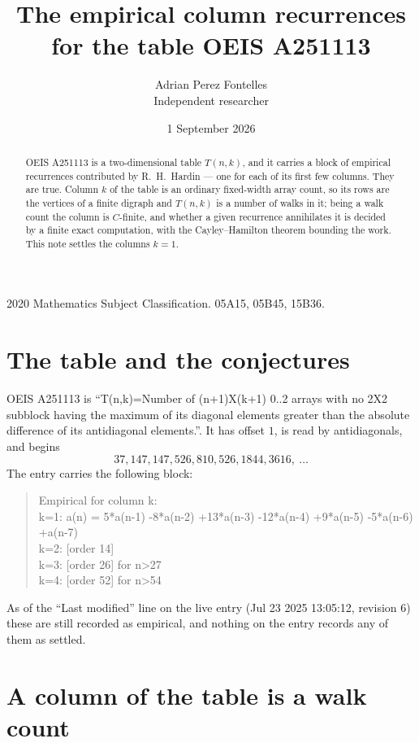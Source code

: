 \documentclass[11pt,a4paper]{article}
\title{The empirical column recurrences for the table OEIS A251113}
\author{Adrian Perez Fontelles\\ \small Independent researcher}
\date{1 September 2026}
\theoremstyle{plain}
\theoremstyle{definition}
\begin{document}
\maketitle

\begin{abstract}
OEIS A251113 is a two-dimensional table $T(n,k)$, and it carries a block of empirical
recurrences contributed by R.~H.~Hardin --- one for each of its first few columns. They are
true. Column $k$ of the table is an ordinary fixed-width array count, so its rows are the
vertices of a finite digraph and $T(n,k)$ is a number of walks in it; being a walk count the
column is $C$-finite, and whether a given recurrence annihilates it is decided by a finite
exact computation, with the Cayley--Hamilton theorem bounding the work. This note settles the
columns $k=1$.
\end{abstract}

\noindent\small 2020 Mathematics Subject Classification. 05A15, 05B45, 15B36.\normalsize

\section{The table and the conjectures}

OEIS A251113 is ``T(n,k)=Number of (n+1)X(k+1) 0..2 arrays with no 2X2 subblock having the maximum of its diagonal elements greater than the absolute difference of its antidiagonal elements.''. It has offset $1$, is
read by antidiagonals, and begins
\[
37, 147, 147, 526, 810, 526, 1844, 3616,\ \dots
\]
The entry carries the following block:
\begin{quote}\small
Empirical for column k:\\
k=1: a(n) = 5*a(n-1) -8*a(n-2) +13*a(n-3) -12*a(n-4) +9*a(n-5) -5*a(n-6) +a(n-7)\\
k=2: [order 14]\\
k=3: [order 26] for n>27\\
k=4: [order 52] for n>54\\
\end{quote}
As of the ``Last modified'' line on the live entry (Jul 23 2025 13:05:12, revision 6) these are still
recorded as empirical, and nothing on the entry records any of them as settled.

\section{A column of the table is a walk count}
\end{document}
